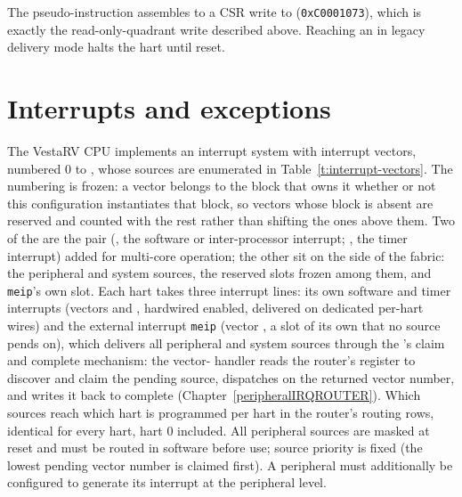 \documentclass[11pt,pdftex,openany,letterpaper]{report}
\begin{document}
\begin{Caution}
The  pseudo-instruction assembles to a CSR write to  (\texttt{0xC0001073}), which is exactly the read-only-quadrant write described above. Reaching an  in legacy delivery mode halts the hart until reset.
\end{Caution}

\clearpage




\chapter{Interrupts and exceptions} \label{s:interrupts}

The VestaRV CPU implements an interrupt system with \VectorsCount{} interrupt vectors, numbered 0 to \TopVector, whose sources are enumerated in Table~\ref{t:interrupt-vectors}. The numbering is frozen: a vector belongs to the block that owns it whether or not this configuration instantiates that block, so vectors whose block is absent are reserved and counted with the rest rather than shifting the ones above them. Two of the \VectorsCount{} are the  pair (\ClintMsipVector, the software or inter-processor interrupt; \ClintMtipVector, the timer interrupt) added for multi-core operation; the other \RoutedVectorsCount{} sit on the  side of the fabric: the peripheral and system sources, the reserved slots frozen among them, and \texttt{meip}'s own slot. Each hart takes three interrupt lines: its own  software and timer interrupts (vectors \ClintMsipVector{} and \ClintMtipVector, hardwired enabled, delivered on dedicated per-hart wires) and the external interrupt \texttt{meip} (vector \MeipVector, a slot of its own that no source pends on), which delivers all peripheral and system sources through the 's claim and complete mechanism: the vector-\MeipVector{} handler reads the router's  register to discover and claim the pending source, dispatches on the returned vector number, and writes it back to complete (Chapter~\ref{peripheralIRQROUTER}). Which sources reach which hart is programmed per hart in the router's routing rows, identical for every hart, hart 0 included. All peripheral sources are masked at reset and must be routed in software before use; source priority is fixed (the lowest pending vector number is claimed first). A peripheral must additionally be configured to generate its interrupt at the peripheral level.
\end{document}
